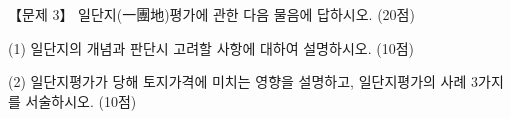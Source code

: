 \begin{longquestion}{【문제 3】}
일단지(一團地)평가에 관한 다음 물음에 답하시오. (20점) \par
\medskip\noindent (1) 일단지의 개념과 판단시 고려할 사항에 대하여 설명하시오. (10점) \par
\medskip\noindent (2) 일단지평가가 당해 토지가격에 미치는 영향을 설명하고, 일단지평가의 사례 3가지를 서술하시오. (10점) \par
\end{longquestion}
